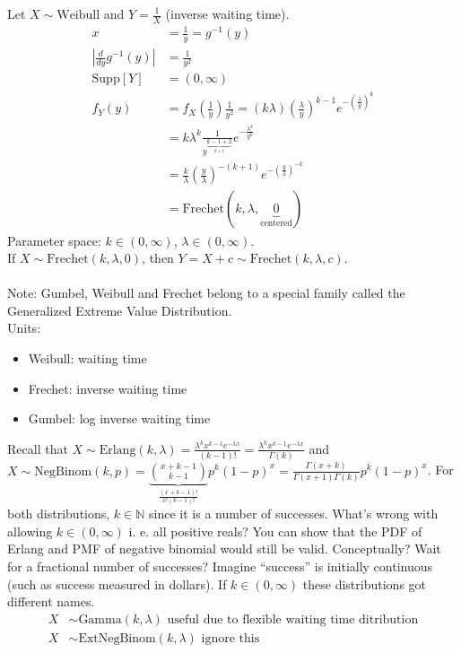 \documentclass[12pt]{article}
\newcommand{\supp}[1]{\text{Supp}[ #1 ]}
\newcommand{\ginvy}{g^{-1}(y)}
\begin{document}
Let $X \sim \text{Weibull}$ and $Y = \frac{1}{X}$ (inverse waiting time). $$\begin{aligned} 
x &= \frac{1}{y} = \ginvy \\ |\frac{d}{dy} \ginvy| &= \frac{1}{y^2} \\ \supp{Y} &= (0, \infty) \\ 
f_Y(y) &= f_X(\frac{1}{y})\frac{1}{y^2} = (k\lambda)(\frac{\lambda}{y})^{k - 1}e^{-(\frac{\lambda}{y})^k} \\ &= k\lambda^k \frac{1}{y^{\underbrace{k - 1 + 2}_{k + 1}}} e^{-\frac{\lambda ^k}{y^k}} \\ &= \frac{k}{\lambda}(\frac{y}{\lambda})^{-(k + 1)}e^{-(\frac{y}{\lambda})^{-k}} \\ &= \text{Frechet}(k, \lambda, \underbrace{0}_{\text{centered}}) \end{aligned} $$ Parameter space: $k \in (0, \infty)$, $\lambda \in (0, \infty)$. \\ If $X \sim \text{Frechet}(k,\lambda,0)$, then $Y = X + c \sim \text{Frechet}(k, \lambda, c)$. \\~\\
Note: Gumbel, Weibull and Frechet belong to a special family called the Generalized Extreme Value Distribution. \\ Units: \begin{itemize} 
\item Weibull: waiting time \item Frechet: inverse waiting time \item Gumbel: log inverse waiting time \end{itemize} 
Recall that $X \sim \text{Erlang}(k, \lambda) = \frac{\lambda^k x^{k - 1}e^{-\lambda x}}{(k - 1)!} = \frac{\lambda^k x^{k - 1}e^{-\lambda x}}{\Gamma(k)}$ and $X \sim \text{NegBinom}(k, p) = \underbrace{\binom{x + k - 1}{k - 1}}_{\frac{(x + k - 1)!}{x!(k - 1)!}} p^k (1 - p)^x = \frac{\Gamma(x + k)}{\Gamma(x + 1)\Gamma(k)}p^k(1 - p)^x$. For both distributions, $k \in \mathbb{N} $ since it is a number of successes. What's wrong with allowing $k \in (0, \infty)$ i. e. all positive reals? You can show that the PDF of Erlang and PMF of negative binomial would still be valid. Conceptually? Wait for a fractional number of successes? Imagine ``success'' is initially continuous (such as success measured in dollars). If $k \in (0, \infty)$ these distributions got different names. 
$$\begin{aligned} X &\sim \text{Gamma}(k, \lambda) \text{ useful due to flexible waiting time ditribution} \\ X &\sim \text{ExtNegBinom}(k, \lambda) \text{ ignore this } \end{aligned} $$ 
\end{document}

